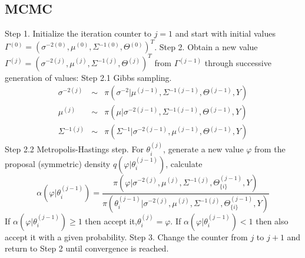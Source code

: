 \documentclass[9pt]{beamer}
\begin{document}
\subsection{MCMC}
\begin{frame}{}
Step 1.
Initialize the iteration counter to $j=1$ and start with initial values $\Gamma{}^{(0)}=(\sigma{}^{-2(0)},\mu{}^{(0)},\Sigma{}^{-1(0)},\Theta{}^{(0)})^{T}$.
Step 2.
Obtain a new value  $\Gamma{}^{(j)}=(\sigma{}^{-2(j)},\mu{}^{(j)},\Sigma{}^{-1(j)},\Theta{}^{(j)})^{T}$ from $\Gamma{}^{(j-1)}$ through successive generation of values:
Step 2.1 Gibbs sampling.
\begin{equation}
\begin{array}{rcl}
\sigma{}^{-2(j)} & \sim{} & \pi{}(\sigma^{-2}|\mu{}^{(j-1)},\Sigma{}^{-1(j-1)},\Theta{}^{(j-1)},Y) \\
\mu{}^{(j)} & \sim{} & \pi{}(\mu{}|\sigma{}^{-2(j-1)},\Sigma{}^{-1(j-1)},\Theta{}^{(j-1)},Y) \\
\Sigma{}^{-1(j)} & \sim{} & \pi{}(\Sigma{}^{-1}|\sigma{}^{-2(j-1)},\mu{}^{(j-1)},\Theta{}^{(j-1)},Y)
\end{array}
\end{equation}
Step 2.2 Metropolis-Hastings step.
For $\theta{}_{i}^{(j)}$, generate a new value $\varphi$ from the proposal (symmetric) density $q(\varphi{}|\theta{}_{i}^{(j-1)})$, calculate
\begin{equation}
\alpha{}(\varphi{}|\theta{}_{i}^{(j-1)})=\frac{\pi{}(\varphi{}|\sigma{}^{-2(j)},\mu{}^{(j)},\Sigma{}^{-1(j)},\Theta{}_{\{i\}}^{(j-1)},Y)}{\pi{}(\theta{}_{i}^{(j-1)}|\sigma{}^{-2(j)},\mu{}^{(j)},\Sigma{}^{-1(j)},\Theta{}_{\{i\}}^{(j-1)},Y)}
\end{equation}
If $\alpha{}(\varphi{}|\theta{}_{i}^{(j-1)})\ge{}1$ then accept it,$\theta{}_{i}^{(j)}=\varphi{}$. If $\alpha{}(\varphi{}|\theta{}_{i}^{(j-1)})<1$ then also accept it with a given probability.
Step 3.
Change the counter from $j$ to $j+1$ and return to Step 2 until convergence is reached.
\end{frame}
\end{document}

